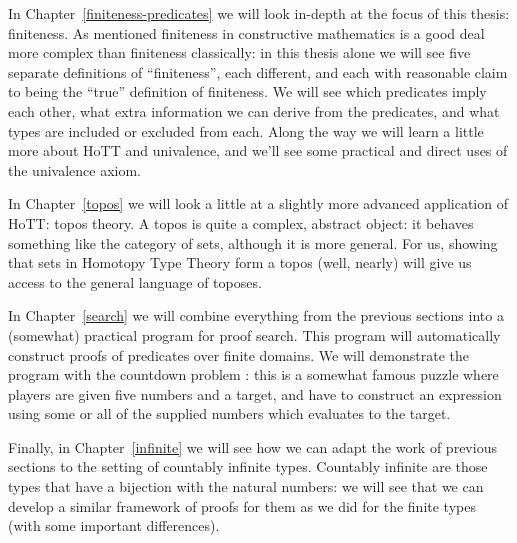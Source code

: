 In Chapter~\ref{finiteness-predicates} we will look in-depth at the focus of
this thesis: finiteness.
As mentioned finiteness in constructive mathematics is a good deal more complex
than finiteness classically:
in this thesis alone we will see five separate definitions of ``finiteness'',
each different, and each with reasonable claim to being the ``true'' definition
of finiteness.
We will see which predicates imply each other, what extra information we can
derive from the predicates, and what types are included or excluded from each.
Along the way we will learn a little more about HoTT and univalence, and we'll
see some practical and direct uses of the univalence axiom.

In Chapter~\ref{topos} we will look a little at a slightly more advanced
application of HoTT: topos theory.
A topos is quite a complex, abstract object: it behaves something like the
category of sets, although it is more general.
For us, showing that sets in Homotopy Type Theory form a topos (well, nearly)
will give us access to the general language of toposes.

In Chapter~\ref{search} we will combine everything from the previous sections
into a (somewhat) practical program for proof search.
This program will automatically construct proofs of predicates over finite
domains.
We will demonstrate the program with the countdown problem
\citep{huttonCountdownProblem2002}: this is a somewhat famous puzzle where
players are given five numbers and a target, and have to construct an expression
using some or all of the supplied numbers which evaluates to the target.

Finally, in Chapter~\ref{infinite} we will see how we can adapt the work of
previous sections to the setting of countably infinite types.
Countably infinite are those types that have a bijection with the natural
numbers: we will see that we can develop a similar framework of proofs for them
as we did for the finite types (with some important differences).
